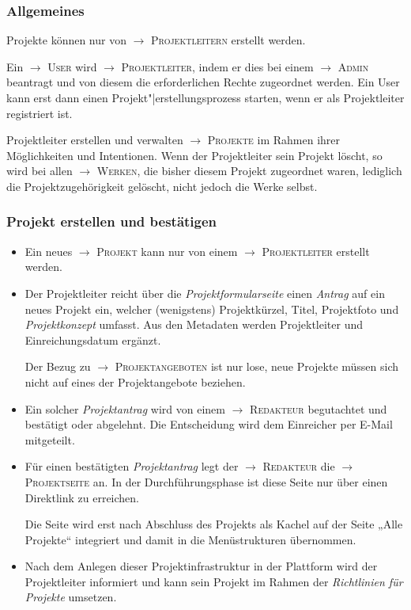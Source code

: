\documentclass[a4paper,11pt]{article}
\newcommand{\glossar}[1]{{$\to$ \textsc{#1}}}
\begin{document}
\subsubsection{Allgemeines}
 
Projekte können nur von \glossar{Projektleitern} erstellt werden.

Ein \glossar{User} wird \glossar{Projektleiter}, indem er dies bei einem
\glossar{Admin} beantragt und von diesem die erforderlichen Rechte zugeordnet
werden.  Ein User kann erst dann einen Projekt"|erstellungsprozess starten,
wenn er als Projektleiter registriert ist.

Projektleiter erstellen und verwalten \glossar{Projekte} im Rahmen ihrer
Möglichkeiten und Intentionen. Wenn der Projektleiter sein Projekt löscht, so
wird bei allen \glossar{Werken}, die bisher diesem Projekt zugeordnet waren,
lediglich die Projektzugehörigkeit gelöscht, nicht jedoch die Werke selbst.

\subsubsection{Projekt erstellen und bestätigen}

\begin{itemize}
\item Ein neues \glossar{Projekt} kann nur von einem \glossar{Projektleiter}
  erstellt werden.
\item Der Projektleiter reicht über die \emph{Projektformularseite} einen
  \emph{Antrag} auf ein neues Projekt ein, welcher (wenigstens) Projektkürzel,
  Titel, Projektfoto und \emph{Projektkonzept} umfasst. Aus den Metadaten
  werden Projektleiter und Einreichungsdatum ergänzt.

  Der Bezug zu \glossar{Projektangeboten} ist nur lose, neue Projekte müssen
  sich nicht auf eines der Projektangebote beziehen.

\item Ein solcher \emph{Projektantrag} wird von einem \glossar{Redakteur}
  begutachtet und bestätigt oder abgelehnt.  Die Entscheidung wird dem
  Einreicher per E-Mail mitgeteilt. 

\item Für einen bestätigten \emph{Projektantrag} legt der \glossar{Redakteur}
  die \glossar{Projektseite} an.  In der Durchführungsphase ist diese Seite
  nur über einen Direktlink zu erreichen.

  Die Seite wird erst nach Abschluss des Projekts als Kachel auf der Seite
  „Alle Projekte“ integriert und damit in die Menüstrukturen übernommen.

\item Nach dem Anlegen dieser Projektinfrastruktur in der Plattform wird der
  Projektleiter informiert und kann sein Projekt im Rahmen der
  \emph{Richtlinien für Projekte} umsetzen. 

\end{itemize}
\end{document}
